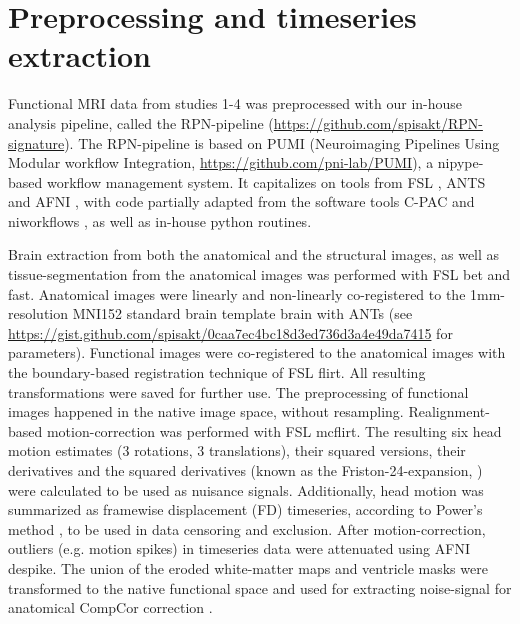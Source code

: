 \documentclass{article}
\begin{document}
\section{Preprocessing and timeseries extraction}

Functional MRI data from studies 1-4 was preprocessed with our in-house analysis pipeline, called the RPN-pipeline (\href{https://github.com/spisakt/RPN-signature}{https://github.com/spisakt/RPN-signature}). The RPN-pipeline is based on PUMI (Neuroimaging Pipelines Using Modular workflow Integration, \href{https://github.com/pni-lab/PUMI}{https://github.com/pni-lab/PUMI}), a nipype-based \citep{gorgolewski2011nipype} workflow management system. It capitalizes on tools from FSL \citep{jenkinson2012fsl}, ANTS \citep{avants2011reproducible} and AFNI \citep{cox1996afni}, with code partially adapted from the software tools C-PAC \citep{craddock2013towards} and niworkflows \citep{esteban2019fmriprep}, as well as in-house python routines.

Brain extraction from both the anatomical and the structural images, as well as tissue-segmentation from the anatomical images was performed with FSL bet and fast. Anatomical images were linearly and non-linearly co-registered to the 1mm-resolution MNI152 standard brain template brain with ANTs (see \href{https://gist.github.com/spisakt/0caa7ec4bc18d3ed736d3a4e49da7415}{https://gist.github.com/spisakt/0caa7ec4bc18d3ed736d3a4e49da7415} for parameters).
Functional images were co-registered to the anatomical images with the boundary-based registration technique of FSL flirt. All resulting transformations were saved for further use. The preprocessing of functional images happened in the native image space, without resampling. Realignment-based motion-correction was performed with FSL mcflirt. The resulting six head motion estimates (3 rotations, 3 translations), their squared versions, their derivatives and the squared derivatives (known as the Friston-24-expansion, \cite{friston1996movement}) were calculated to be used as nuisance signals. Additionally, head motion was summarized as framewise displacement (FD) timeseries, according to Power's method \citep{power2012spurious}, to be used in data censoring and exclusion. After motion-correction, outliers (e.g. motion spikes) in timeseries data were attenuated using AFNI despike. The union of the eroded white-matter maps and ventricle masks were transformed to the native functional space and used for extracting noise-signal for anatomical CompCor correction \citep{behzadi2007component}.
\end{document}
